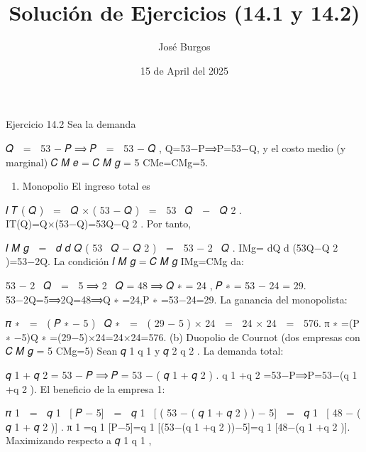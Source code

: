 \documentclass[
]{article}
\title{Solución de Ejercicios (14.1 y 14.2)}
\author{José Burgos}
\date{15 de April del 2025}
\providecommand{\tightlist}{%
  \setlength{\itemsep}{0pt}\setlength{\parskip}{0pt}}
\begin{document}
\maketitle

Ejercicio 14.2 Sea la demanda

𝑄    =    53 − 𝑃 ⟹ 𝑃    =    53 − 𝑄 , Q=53−P⟹P=53−Q, y el costo medio (y
marginal) 𝐶 𝑀 𝑒 = 𝐶 𝑀 𝑔 = 5 CMe=CMg=5.

\begin{enumerate}
\def\labelenumi{(\alph{enumi})}
\tightlist
\item
  Monopolio El ingreso total es
\end{enumerate}

𝐼 𝑇 ( 𝑄 )    =    𝑄 × ( 53 − 𝑄 )    =    53   𝑄    −    𝑄 2 .
IT(Q)=Q×(53−Q)=53Q−Q 2 . Por tanto,

𝐼 𝑀 𝑔    =    𝑑 𝑑 𝑄 ( 53   𝑄 − 𝑄 2 )    =    53 − 2   𝑄 . IMg= dQ d
\hspace{0pt} (53Q−Q 2 )=53−2Q. La condición 𝐼 𝑀 𝑔 = 𝐶 𝑀 𝑔 IMg=CMg da:

53 − 2   𝑄    =    5 ⟹ 2   𝑄 = 48 ⟹ 𝑄 ∗ = 24 , 𝑃 ∗ = 53 − 24 = 29.
53−2Q=5⟹2Q=48⟹Q ∗ =24,P ∗ =53−24=29. La ganancia del monopolista:

𝜋 ∗    =    ( 𝑃 ∗ − 5 )   𝑄 ∗    =    ( 29 − 5 ) × 24    =    24 × 24   
=    576. π ∗ =(P ∗ −5)Q ∗ =(29−5)×24=24×24=576. (b) Duopolio de Cournot
(dos empresas con 𝐶 𝑀 𝑔 = 5 CMg=5) Sean 𝑞 1 q 1 \hspace{0pt} y 𝑞 2 q 2
\hspace{0pt} . La demanda total:

𝑞 1 + 𝑞 2 = 53 − 𝑃 ⟹ 𝑃 = 53 − ( 𝑞 1 + 𝑞 2 ) . q 1 \hspace{0pt} +q 2
\hspace{0pt} =53−P⟹P=53−(q 1 \hspace{0pt} +q 2 \hspace{0pt} ). El
beneficio de la empresa 1:

𝜋 1    =    𝑞 1   {[} 𝑃 − 5{]}    =    𝑞 1   {[} ( 53 − ( 𝑞 1 + 𝑞 2 ) )
− 5{]}    =    𝑞 1   {[} 48 − ( 𝑞 1 + 𝑞 2 ){]} . π 1 \hspace{0pt} =q 1
\hspace{0pt} {[}P−5{]}=q 1 \hspace{0pt} {[}(53−(q 1 \hspace{0pt} +q 2
\hspace{0pt} ))−5{]}=q 1 \hspace{0pt} {[}48−(q 1 \hspace{0pt} +q 2
\hspace{0pt} ){]}. Maximizando respecto a 𝑞 1 q 1 \hspace{0pt} ,
\end{document}
